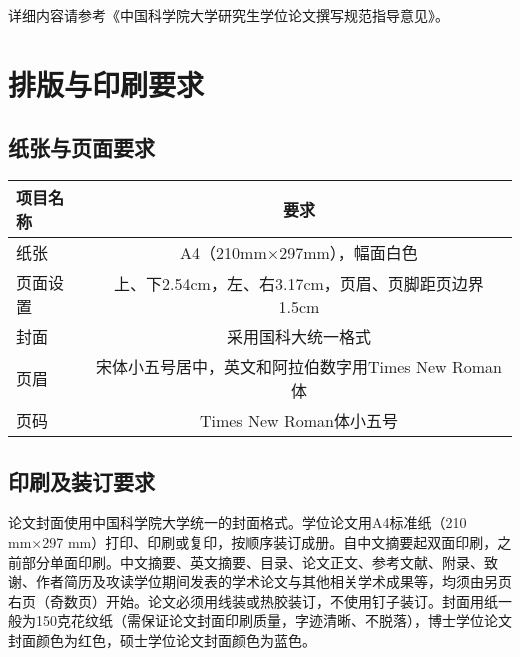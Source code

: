 详细内容请参考《中国科学院大学研究生学位论文撰写规范指导意见》。

\section{排版与印刷要求}

\subsection{纸张与页面要求}
\begin{table}[h]
    \centering
    \begin{tabular}{lc}
        \hline
        项目名称 & 要求\\
        \hline
        纸张&A4（210mm×297mm），幅面白色\\
        页面设置&上、下2.54cm，左、右3.17cm，页眉、页脚距页边界1.5cm\\
        封面&采用国科大统一格式\\
        页眉&宋体小五号居中，英文和阿拉伯数字用Times New Roman体\\
        页码&Times New Roman体小五号 \\

        \hline
    \end{tabular}

    \label{tab:printrequirements}
\end{table}

\subsection{印刷及装订要求}
论文封面使用中国科学院大学统一的封面格式。学位论文用A4标准纸（210 mm×297 mm）打印、印刷或复印，按顺序装订成册。自中文摘要起双面印刷，之前部分单面印刷。中文摘要、英文摘要、目录、论文正文、参考文献、附录、致谢、作者简历及攻读学位期间发表的学术论文与其他相关学术成果等，均须由另页右页（奇数页）开始。论文必须用线装或热胶装订，不使用钉子装订。封面用纸一般为150克花纹纸（需保证论文封面印刷质量，字迹清晰、不脱落），博士学位论文封面颜色为红色，硕士学位论文封面颜色为蓝色。

